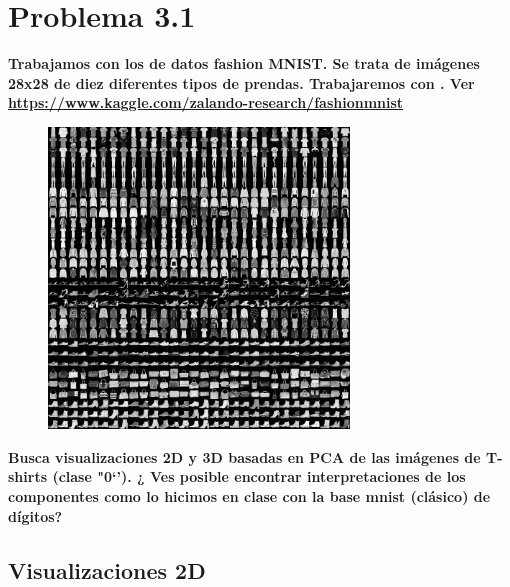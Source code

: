 \section*{Problema 3.1}

\textbf{Trabajamos con los de datos fashion MNIST. Se trata de imágenes 28x28 de diez diferentes tipos de prendas. Trabajaremos con .  Ver \url{https://www.kaggle.com/zalando-research/fashionmnist}}

\begin{figure}[H]
    \centering
    \includegraphics[width=8cm]{Graphics/Problema_3_1.png}
    \caption{}
\end{figure}

\textbf{Busca visualizaciones 2D y 3D basadas en PCA de las imágenes de T-shirts (clase "0`'). ¿ Ves posible encontrar interpretaciones de los componentes como lo hicimos en clase con la base mnist (clásico) de dígitos?}


\subsection*{Visualizaciones 2D}

